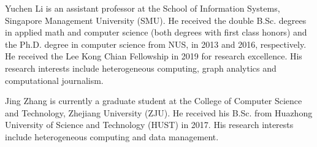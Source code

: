 \documentclass[10pt,journal,compsoc]{IEEEtran}
\begin{document}
\maketitle
\IEEEdisplaynontitleabstractindextext
\IEEEpeerreviewmaketitle











%





\begin{IEEEbiography}
	{Yuchen Li} is an assistant professor at the School of Information Systems, Singapore Management University (SMU).
	He received the double B.Sc. degrees in applied math and computer science (both degrees with first class honors)
	and the Ph.D. degree in computer science from NUS, in 2013 and 2016, respectively. He received the Lee Kong Chian Fellowship in 2019 for research excellence.
	His research interests include heterogeneous computing, graph analytics and computational journalism.
\end{IEEEbiography}
\vspace*{-2\baselineskip}

\begin{IEEEbiography}
	{Jing Zhang} is currently a graduate student at the College of Computer Science and Technology, Zhejiang University (ZJU). He received his B.Sc. from Huazhong University of Science and Technology (HUST) in 2017. His research interests include heterogeneous computing and data management.
\end{IEEEbiography}
\vspace*{-2\baselineskip}
\end{document}
